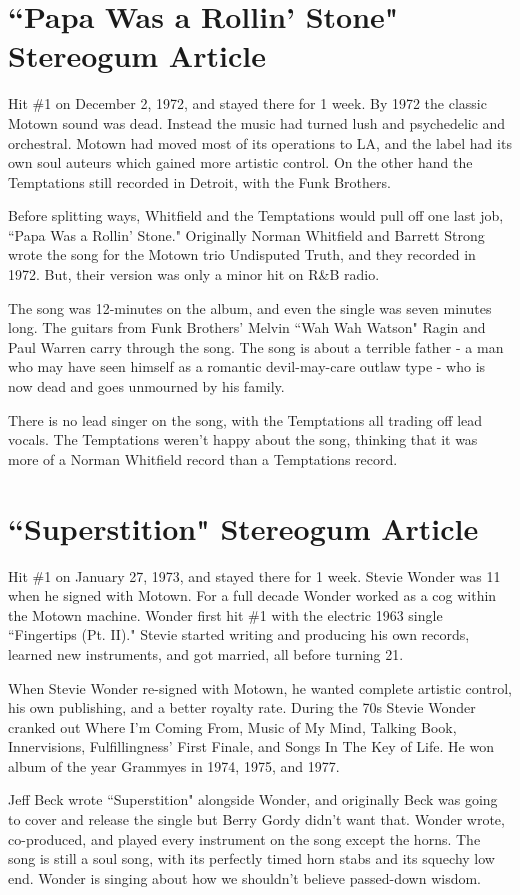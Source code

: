 \documentclass[12pt, a4paper, twoside, openright, titlepage]{book}
\begin{document}
\section{``Papa Was a Rollin' Stone" Stereogum Article}

Hit \#1 on December 2, 1972, and stayed there for 1 week. By 1972 the classic Motown sound was dead. Instead the music had turned lush and psychedelic and orchestral. Motown had moved most of its operations to LA, and the label had its own soul auteurs which gained more artistic control. On the other hand the Temptations still recorded in Detroit, with the Funk Brothers. 

Before splitting ways, Whitfield and the Temptations would pull off one last job, ``Papa Was a Rollin' Stone." Originally Norman Whitfield and Barrett Strong wrote the song for the Motown trio Undisputed Truth, and they recorded in 1972. But, their version was only a minor hit on R\&B radio.

The song was 12-minutes on the album, and even the single was seven minutes long. The guitars from Funk Brothers' Melvin ``Wah Wah Watson" Ragin and Paul Warren carry through the song. The song is about a terrible father - a man who may have seen himself as a romantic devil-may-care outlaw type - who is now dead and goes unmourned by his family.

There is no lead singer on the song, with the Temptations all trading off lead vocals. The Temptations weren't happy about the song, thinking that it was more of a Norman Whitfield record than a Temptations record.



\section{``Superstition" Stereogum Article}

Hit \#1 on January 27, 1973, and stayed there for 1 week. Stevie Wonder was 11 when he signed with Motown. For a full decade Wonder worked as a cog within the Motown machine. Wonder first hit \#1 with the electric 1963 single ``Fingertips (Pt. II)." Stevie started writing and producing his own records, learned new instruments, and got married, all before turning 21. 

When Stevie Wonder re-signed with Motown, he wanted complete artistic control, his own publishing, and a better royalty rate. During the 70s Stevie Wonder cranked out Where I'm Coming From, Music of My Mind, Talking Book, Innervisions, Fulfillingness' First Finale, and Songs In The Key of Life. He won album of the year Grammyes in 1974, 1975, and 1977. 

Jeff Beck wrote ``Superstition" alongside Wonder, and originally Beck was going to cover and release the single but Berry Gordy didn't want that. Wonder wrote, co-produced, and played every instrument on the song except the horns. The song is still a soul song, with its perfectly timed horn stabs and its squechy low end. Wonder is singing about how we shouldn't believe passed-down wisdom. 
\end{document}

